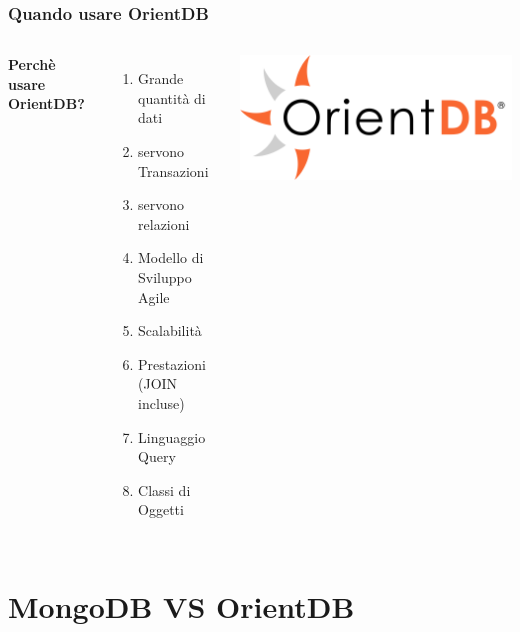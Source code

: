 \documentclass{beamer}
\begin{document}
\begin{frame}
\frametitle{Quando usare OrientDB}
\begin{columns}[c] %

\textbf{Perchè usare OrientDB?}
\begin{enumerate}
\item Grande quantità di dati
\item servono Transazioni
\item servono relazioni
\item Modello di Sviluppo Agile
\item Scalabilità
\item Prestazioni (JOIN incluse)
\item Linguaggio Query
\item Classi di Oggetti
\end{enumerate}

\includegraphics[width=1\linewidth]{orientdb.png}

\end{columns}
\end{frame}

\section{MongoDB VS OrientDB}
\end{document}
